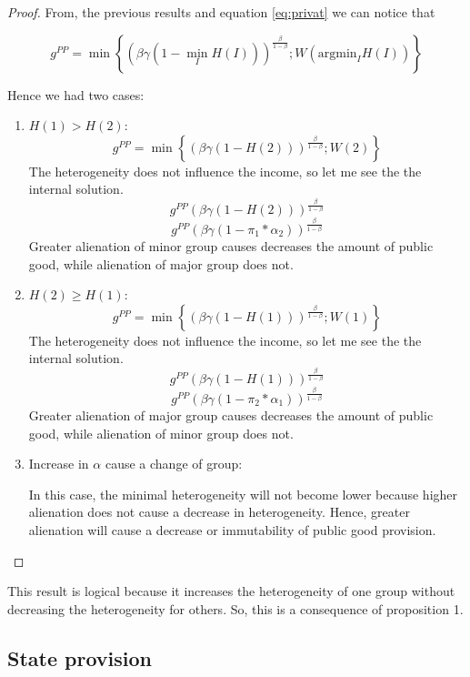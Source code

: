 \documentclass[12pt]{article}
\begin{document}
\begin{proof}
From, the previous results and equation \ref{eq:privat} we can notice that

\[ g^{PP} = \min \left\{ (\beta\gamma  ( 1 - \min_{I} H(I)))^\frac{\beta}{1 -\beta}; W( \text{argmin}_{I} H(I)) \right\} \]

Hence we had two cases:
\begin{enumerate}
    \item $H(1) > H(2)$:
    \[ g^{PP} = \min \left\{ (\beta\gamma  ( 1 - H(2)))^\frac{\beta}{1 -\beta}; W(2) \right\} \]
    The heterogeneity does not influence the income, so let me see the the internal solution.
    \[ g^{PP} (\beta\gamma  ( 1 - H(2)))^\frac{\beta}{1 -\beta} \]
    \[ g^{PP} (\beta\gamma  ( 1 - \pi_1 * \alpha_2))^\frac{\beta}{1 -\beta} \]
    Greater alienation of minor group causes decreases the amount of public good, while alienation of major group does not.
    
    \item $H(2) \ge H(1)$:
    \[ g^{PP} = \min \left\{ (\beta\gamma  ( 1 - H(1)))^\frac{\beta}{1 -\beta}; W(1) \right\} \]
    The heterogeneity does not influence the income, so let me see the the internal solution.
    \[ g^{PP} (\beta\gamma  ( 1 - H(1)))^\frac{\beta}{1 -\beta} \]
    \[ g^{PP} (\beta\gamma  ( 1 - \pi_2 * \alpha_1))^\frac{\beta}{1 -\beta} \]
    Greater alienation of major group causes decreases the amount of public good, while alienation of minor group does not.
    
    \item Increase in $\alpha$ cause a change of group:
    
    In this case, the minimal heterogeneity will not become lower because higher alienation does not cause a decrease in heterogeneity. Hence, greater alienation will cause a decrease or immutability of public good provision.
    
\end{enumerate}

\end{proof}

This result is logical because it increases the heterogeneity of one group without decreasing the heterogeneity for others. So, this is a consequence of proposition 1. 

\subsection{State provision}
\end{document}
